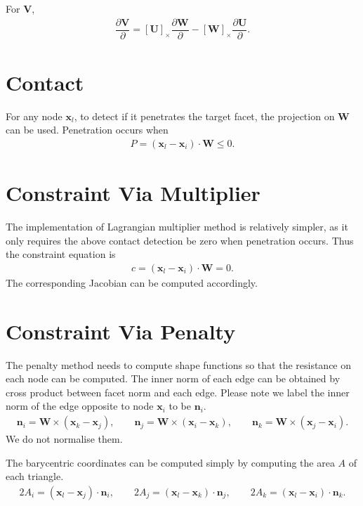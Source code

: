 \documentclass[10pt,fleqn,3p]{elsarticle}
\newcommand*{\skewsymm}[1]{\left[#1\right]_\times}
\newcommand*{\pfrac}[2]{\dfrac{\partial#1}{\partial#2}}
\begin{document}
For $\mathbold{V}$,
\begin{gather*}
\pfrac{\mathbold{V}}{}=\skewsymm{\mathbold{U}}\pfrac{\mathbold{W}}{}-\skewsymm{\mathbold{W}}\pfrac{\mathbold{U}}{}.
\end{gather*}
\section*{Contact}
For any node $\mathbold{x}_l$, to detect if it penetrates the target facet, the projection on $\mathbold{W}$ can be used. Penetration occurs when
\begin{gather*}
P=\left(\mathbold{x}_l-\mathbold{x}_i\right)\cdot\mathbold{W}\le0.
\end{gather*}
\section*{Constraint Via Multiplier}
The implementation of Lagrangian multiplier method is relatively simpler, as it only requires the above contact detection be zero when penetration occurs. Thus the constraint equation is
\begin{gather*}
c=\left(\mathbold{x}_l-\mathbold{x}_i\right)\cdot\mathbold{W}=0.
\end{gather*}
The corresponding Jacobian can be computed accordingly.
\section*{Constraint Via Penalty}
The penalty method needs to compute shape functions so that the resistance on each node can be computed. The inner norm of each edge can be obtained by cross product between facet norm and each edge. Please note we label the inner norm of the edge opposite to node $\mathbold{x}_i$ to be $\mathbold{n}_i$.
\begin{gather*}
\mathbold{n}_i=\mathbold{W}\times\left(\mathbold{x}_k-\mathbold{x}_j\right),\qquad
\mathbold{n}_j=\mathbold{W}\times\left(\mathbold{x}_i-\mathbold{x}_k\right),\qquad
\mathbold{n}_k=\mathbold{W}\times\left(\mathbold{x}_j-\mathbold{x}_i\right).
\end{gather*}
We do not normalise them.

The barycentric coordinates can be computed simply by computing the area $A$ of each triangle.
\begin{gather*}
2A_i=\left(\mathbold{x}_l-\mathbold{x}_j\right)\cdot\mathbold{n}_i,\qquad
2A_j=\left(\mathbold{x}_l-\mathbold{x}_k\right)\cdot\mathbold{n}_j,\qquad
2A_k=\left(\mathbold{x}_l-\mathbold{x}_i\right)\cdot\mathbold{n}_k.
\end{gather*}
\end{document}
